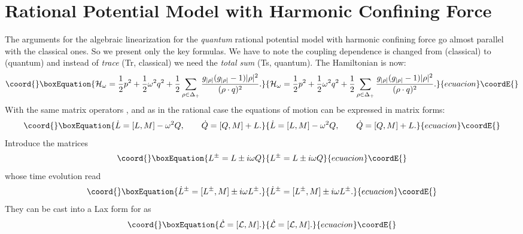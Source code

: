 \documentclass[a4paper,12pt]{article}
\begin{document}
\section{Rational Potential Model with Harmonic Confining Force}
\label{harm}
\setcounter{equation}{0}

The arguments for the algebraic linearization for the {\em quantum}
rational potential model with harmonic confining force go almost parallel
with the classical ones. So we present only the key formulas.
We have to note the coupling dependence is changed
from \coordHE{} (classical) to \coordHE{} (quantum)
and instead of {\em trace} (Tr, classical)
we need the {\em total sum} (Ts, quantum).
The Hamiltonian is now:
\begin{equation}\coord{}\boxEquation{
    {\cal H}_{\omega}={1\over2}p^2+{1\over2}\omega^2q^2+
       {1\over2}\sum_{\rho\in\Delta_+}
     {g_{|\rho|}(g_{|\rho|}-1) |\rho|^{2}\over{(\rho\cdot
          q)^2}}.
     \label{harmham}
}{
    {\cal H}_{\omega}={1\over2}p^2+{1\over2}\omega^2q^2+
       {1\over2}\sum_{\rho\in\Delta_+}
     {g_{|\rho|}(g_{|\rho|}-1) |\rho|^{2}\over{(\rho\cdot
          q)^2}}.
     }{ecuacion}\coordE{}\end{equation}
With the same matrix operators \coordHE{}, \coordHE{} and \coordHE{} as in the rational case
the equations of motion can be expressed in matrix forms:
\begin{equation}\coord{}\boxEquation{\label{RCPL}
  \dot{L}=[L,M]-\omega^2Q, \qquad
  \dot{Q}=[Q,M]+L.
}{\dot{L}=[L,M]-\omega^2Q, \qquad
  \dot{Q}=[Q,M]+L.
}{ecuacion}\coordE{}\end{equation}
Introduce the matrices
\begin{equation}\coord{}\boxEquation{
L^{\pm}=L\pm i\omega Q
}{
L^{\pm}=L\pm i\omega Q
}{ecuacion}\coordE{}\end{equation}
whose time evolution read
\begin{equation}\coord{}\boxEquation{
\dot{L}^\pm
 = [L^\pm, M]\pm i\omega L^\pm.
}{
\dot{L}^\pm
 = [L^\pm, M]\pm i\omega L^\pm.
}{ecuacion}\coordE{}\end{equation}
They can be cast into a Lax form for \coordHE{} as
\begin{equation}\coord{}\boxEquation{
    \dot{{\cal L}}=[{\cal L},M].
\label{calLlax}
}{
    \dot{{\cal L}}=[{\cal L},M].
}{ecuacion}\coordE{}\end{equation}
\end{document}
